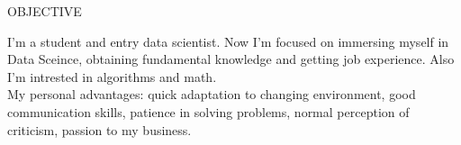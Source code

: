\documentclass{resume} %
\begin{document}

\begin{rSection}{OBJECTIVE}

I'm a student and entry data scientist. Now I'm focused on immersing myself in Data Sceince, obtaining fundamental knowledge and getting job experience. Also I'm intrested in algorithms and math. \\
My personal advantages: quick adaptation to changing environment, good communication skills, patience in solving problems, normal perception of criticism, passion to my business.


\end{rSection}
\end{document}
